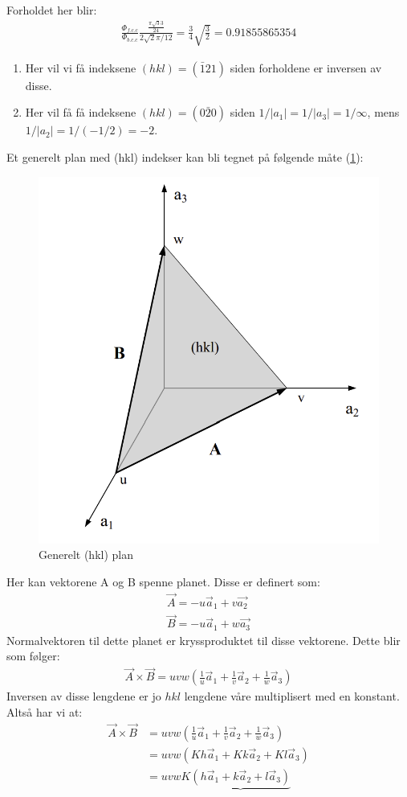 \documentclass{article}
\begin{document}
Forholdet her blir:
\begin{align}
    \frac{\Phi_{f.c.c}}{\Phi_{b.c.c}}\frac{\frac{\pi \sqrt{3} 3}{24}}{2 \sqrt{2} \pi / 12} = \frac{3}{4} \sqrt{\frac{3}{2}} = 0.91855865354
\end{align}
\begin{enumerate}
    \item Her vil vi få indeksene $(hkl) = (\bar{1}21)$ siden forholdene er inversen av disse.
    \item Her vil få få indeksene $(hkl) = (0\bar{2}0)$ siden $1/|a_1| = 1/|a_3| = 1 / \infty$, mens $1 / |a_2| = 1 / (- 1/2) = -2$.
\end{enumerate}
Et generelt plan med (hkl) indekser kan bli tegnet på følgende måte (\ref{fig:hkl_plan}):
\begin{figure}[H]
    \centering
    \includegraphics[width=0.5\linewidth]{bilder_lf/hkl_plan.png}
    \caption{Generelt (hkl) plan}
    \label{fig:hkl_plan}
\end{figure}
Her kan vektorene A og B spenne planet. Disse er definert som:
\begin{align}
    \vec{A} = -u \vec{a}_1 + v\vec{a_2}\\
    \vec{B} = -u \vec{a}_1 + w\vec{a_3}
\end{align}
Normalvektoren til dette planet er kryssproduktet til disse vektorene. Dette blir som følger:
\begin{align}
    \vec{A} \times \vec{B} = uvw( \frac{1}{u} \vec{a}_1+\frac{1}{v} \vec{a}_2+\frac{1}{w} \vec{a}_3)
\end{align}
Inversen av disse lengdene er jo $hkl$ lengdene våre multiplisert med en konstant. Altså har vi at:
\begin{align}
    \vec{A} \times \vec{B} &= uvw( \frac{1}{u} \vec{a}_1+\frac{1}{v} \vec{a}_2+\frac{1}{w} \vec{a}_3) \\
    &= uvw( Kh \vec{a}_1+Kk \vec{a}_2+Kl \vec{a}_3)\\
    &= uvw K\underbrace{( h \vec{a}_1+k \vec{a}_2+l \vec{a}_3)}
\end{align}
\end{document}
